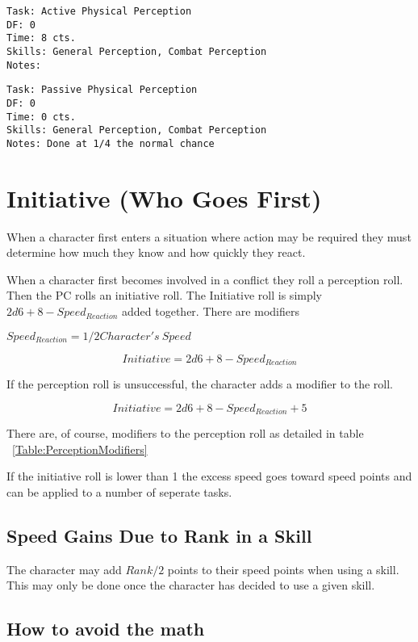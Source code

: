 \begin{verbatim}
Task: Active Physical Perception  
DF: 0 
Time: 8 cts. 
Skills: General Perception, Combat Perception
Notes: 
\end{verbatim}

\begin{verbatim}
Task: Passive Physical Perception  
DF: 0 
Time: 0 cts. 
Skills: General Perception, Combat Perception
Notes: Done at 1/4 the normal chance 
\end{verbatim}



\section{{Initiative} (Who Goes First)}

When a character first enters a situation where action may be required they must determine
how much they know and how quickly they react.

When a character first becomes involved in a conflict they roll a perception roll. Then the PC rolls an initiative roll. The 
Initiative roll is simply $ 2d6 + 8 - Speed_{Reaction} $ added together. There are modifiers 

$ Speed_{Reaction} = 1/2 {Character's\ Speed } $

\[{Initiative} = 2d6 + 8 - Speed_{Reaction}\]

If the perception roll is unsuccessful, the character adds a modifier 
to the roll. 

\[{Initiative} = 2d6 + 8 - Speed_{Reaction} + 5\]

There are, of course, modifiers to the perception roll as detailed in table 
~\ref{Table:PerceptionModifiers}

If the initiative roll is lower than 1 the excess speed goes toward speed points 
and can be applied to a number of seperate tasks.

\subsection{Speed Gains Due to Rank in a Skill}

The character may add \( Rank/2 \) points to their speed points when using a
skill. This may only be done once the character has decided to use a
given skill. 

\subsection{How to avoid the math}


